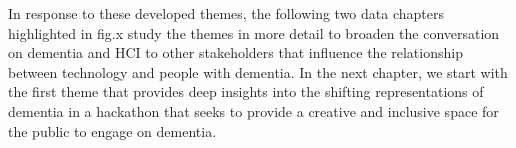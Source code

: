 In response to these developed themes, the following two data chapters highlighted in fig.x study the themes in more detail to broaden the conversation on dementia and HCI to other stakeholders that influence the relationship between technology and people with dementia. In the next chapter, we start with the first theme that provides deep insights into the shifting representations of dementia in a hackathon that seeks to provide a creative and inclusive space for the public to engage on dementia.
